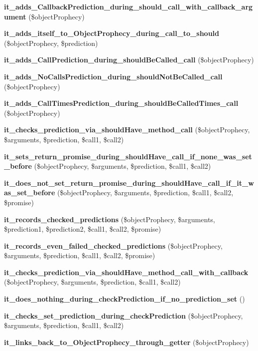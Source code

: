 \begin{DoxyCompactItemize}
{\bf it\+\_\+adds\+\_\+\+Callback\+Prediction\+\_\+during\+\_\+should\+\_\+call\+\_\+with\+\_\+callback\+\_\+argument} (\$object\+Prophecy)
\item 
{\bf it\+\_\+adds\+\_\+itself\+\_\+to\+\_\+\+Object\+Prophecy\+\_\+during\+\_\+call\+\_\+to\+\_\+should} (\$object\+Prophecy, \$prediction)
\item 
{\bf it\+\_\+adds\+\_\+\+Call\+Prediction\+\_\+during\+\_\+should\+Be\+Called\+\_\+call} (\$object\+Prophecy)
\item 
{\bf it\+\_\+adds\+\_\+\+No\+Calls\+Prediction\+\_\+during\+\_\+should\+Not\+Be\+Called\+\_\+call} (\$object\+Prophecy)
\item 
{\bf it\+\_\+adds\+\_\+\+Call\+Times\+Prediction\+\_\+during\+\_\+should\+Be\+Called\+Times\+\_\+call} (\$object\+Prophecy)
\item 
{\bf it\+\_\+checks\+\_\+prediction\+\_\+via\+\_\+should\+Have\+\_\+method\+\_\+call} (\$object\+Prophecy, \$arguments, \$prediction, \$call1, \$call2)
\item 
{\bf it\+\_\+sets\+\_\+return\+\_\+promise\+\_\+during\+\_\+should\+Have\+\_\+call\+\_\+if\+\_\+none\+\_\+was\+\_\+set\+\_\+before} (\$object\+Prophecy, \$arguments, \$prediction, \$call1, \$call2)
\item 
{\bf it\+\_\+does\+\_\+not\+\_\+set\+\_\+return\+\_\+promise\+\_\+during\+\_\+should\+Have\+\_\+call\+\_\+if\+\_\+it\+\_\+was\+\_\+set\+\_\+before} (\$object\+Prophecy, \$arguments, \$prediction, \$call1, \$call2, \$promise)
\item 
{\bf it\+\_\+records\+\_\+checked\+\_\+predictions} (\$object\+Prophecy, \$arguments, \$prediction1, \$prediction2, \$call1, \$call2, \$promise)
\item 
{\bf it\+\_\+records\+\_\+even\+\_\+failed\+\_\+checked\+\_\+predictions} (\$object\+Prophecy, \$arguments, \$prediction, \$call1, \$call2, \$promise)
\item 
{\bf it\+\_\+checks\+\_\+prediction\+\_\+via\+\_\+should\+Have\+\_\+method\+\_\+call\+\_\+with\+\_\+callback} (\$object\+Prophecy, \$arguments, \$prediction, \$call1, \$call2)
\item 
{\bf it\+\_\+does\+\_\+nothing\+\_\+during\+\_\+check\+Prediction\+\_\+if\+\_\+no\+\_\+prediction\+\_\+set} ()
\item 
{\bf it\+\_\+checks\+\_\+set\+\_\+prediction\+\_\+during\+\_\+check\+Prediction} (\$object\+Prophecy, \$arguments, \$prediction, \$call1, \$call2)
\item 
{\bf it\+\_\+links\+\_\+back\+\_\+to\+\_\+\+Object\+Prophecy\+\_\+through\+\_\+getter} (\$object\+Prophecy)

\end{DoxyCompactItemize}

